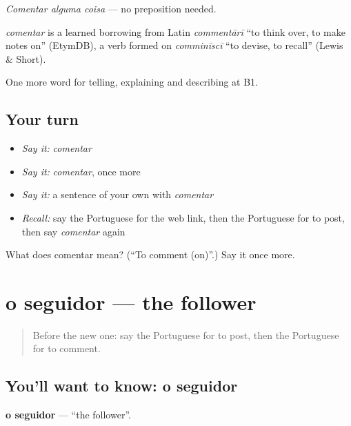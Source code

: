 \emph{Comentar alguma coisa} — no preposition needed.

\begin{cousinweb}
\emph{comentar} is a learned borrowing from Latin \emph{commentārī} \textquotedblleft{}to think over, to make notes on\textquotedblright{} (EtymDB), a verb formed on \emph{comminīscī} \textquotedblleft{}to devise, to recall\textquotedblright{} (Lewis \& Short).
\end{cousinweb}

\begin{grammarlens}[title={What you've built}]
One more word for telling, explaining and describing at B1.
\end{grammarlens}

\subsection*{Your turn}
\begin{itemize}
\raggedright
  \item \emph{Say it:} \emph{comentar}
  \item \emph{Say it:} \emph{comentar}, once more
  \item \emph{Say it:} a sentence of your own with \emph{comentar}
  \item \emph{Recall:} say the Portuguese for the web link, then the Portuguese for to post, then say \emph{comentar} again
\end{itemize}

\begin{tcolorbox}[breakable,colback=teal!4,colframe=teal!35!black,title={Before you move on}]
What does comentar mean? (\textquotedblleft{}To comment (on)\textquotedblright{}.) Say it once more.
\end{tcolorbox}
\section[o seguidor]{o seguidor — the follower}

\label{lesson:PT-C400-seguidor}



\begin{quote}
Before the new one: say the Portuguese for to post, then the Portuguese for to comment.
\end{quote}

\subsection*{You'll want to know: o seguidor}
\textbf{o seguidor} — \textquotedblleft{}the follower\textquotedblright{}.

